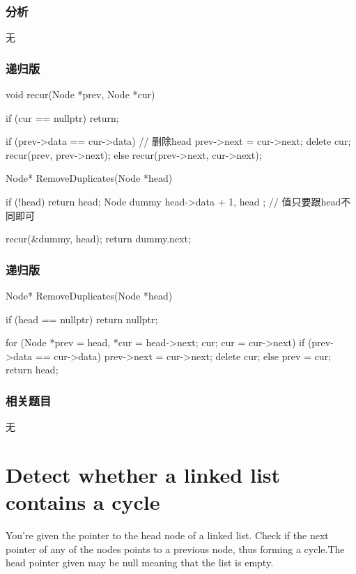 \subsubsection{分析}
无


\subsubsection{递归版}
\begin{Code}
void recur(Node *prev, Node *cur) {
    if (cur == nullptr) return;

    if (prev->data == cur->data) { // 删除head
        prev->next = cur->next;
        delete cur;
        recur(prev, prev->next);
    } else {
        recur(prev->next, cur->next);
    }
}

Node* RemoveDuplicates(Node *head) {
    if (!head) return head;
    Node dummy{ head->data + 1, head }; // 值只要跟head不同即可

    recur(&dummy, head);
    return dummy.next;
}
\end{Code}


\subsubsection{递归版}
\begin{Code}
Node* RemoveDuplicates(Node *head) {
    if (head == nullptr) return nullptr;

    for (Node *prev = head, *cur = head->next; cur; cur = cur->next) {
        if (prev->data == cur->data) {
            prev->next = cur->next;
            delete cur;
        } else {
            prev = cur;
        }
    }
    return head;
}
\end{Code}


\subsubsection{相关题目}
\begindot
\item 无
\myenddot


\section{Detect whether a linked list contains a cycle} %
\label{sec:Detect-whether-a-linked-list-contains-a-cycle}

You’re given the pointer to the head node of a linked list. Check if the next pointer of any of the nodes points to a previous node, thus forming a cycle.The head pointer given may be null meaning that the list is empty.


